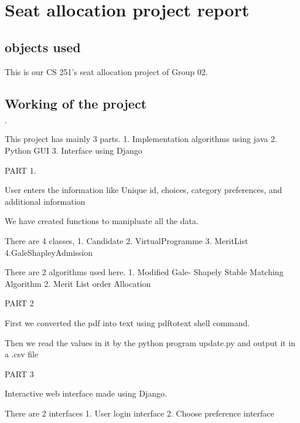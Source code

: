 \documentclass[12 pt]{article}
\begin{document}
  \section{ Seat allocation project report }
     \subsection{objects used}
      This is our CS 251's seat allocation project of Group 02.\\
      \subsection{ Working of the project }
      \begin{list}{$\cdot$}
      \item This project has mainly 3 parts.    1. Implementation algorithms using java 2. Python GUI   3. Interface using Django
      \item PART 1.
      \item User enters the information like Unique id, choices, category preferences, and additional information
      \item We have created functions to manipluate all the data.
      \item There are 4 classes, 1. Candidate 2. VirtualProgramme  3. MeritList 4.GaleShapleyAdmission
      \item There are 2 algorithms used here.   1. Modified Gale- Shapely Stable Matching Algorithm  2. Merit List order Allocation
      \\
      \item  PART 2
      \item  First we converted the pdf into text using pdftotext shell command.
      \item  Then we read the values in it by the python program update.py and output it in a .csv file
      \\
      \item PART 3
      \item  Interactive web interface made using Django.
      \item There are 2 interfaces  1. User login interface  2. Choose preference interface
      \end{list}
\end{document}
